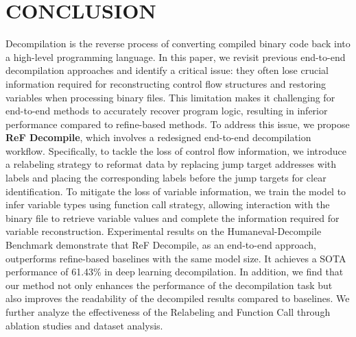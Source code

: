 \section{CONCLUSION}

Decompilation is the reverse process of converting compiled binary code back into a high-level programming language. 
In this paper, we revisit previous end-to-end decompilation approaches and identify a critical issue: they often lose crucial information required for reconstructing control flow structures and restoring variables when processing binary files.
This limitation makes it challenging for end-to-end methods to accurately recover program logic, resulting in inferior performance compared to refine-based methods.
To address this issue, we propose \textbf{ReF Decompile}, which involves a redesigned end-to-end decompilation workflow.
Specifically, to tackle the loss of control flow information, we introduce a relabeling strategy to reformat data by replacing jump target addresses with labels and placing the corresponding labels before the jump targets for clear identification.
To mitigate the loss of variable information, we train the model to infer variable types using function call strategy, allowing interaction with the binary file to retrieve variable values and complete the information required for variable reconstruction.
Experimental results on the Humaneval-Decompile Benchmark demonstrate that ReF Decompile, as an end-to-end approach, outperforms refine-based baselines with the same model size.
It achieves a SOTA performance of 61.43\% in deep learning decompilation.
In addition, we find that our method not only enhances the performance of the decompilation task but also improves the readability of the decompiled results compared to baselines.
We further analyze the effectiveness of the Relabeling and Function Call through ablation studies and dataset analysis.
